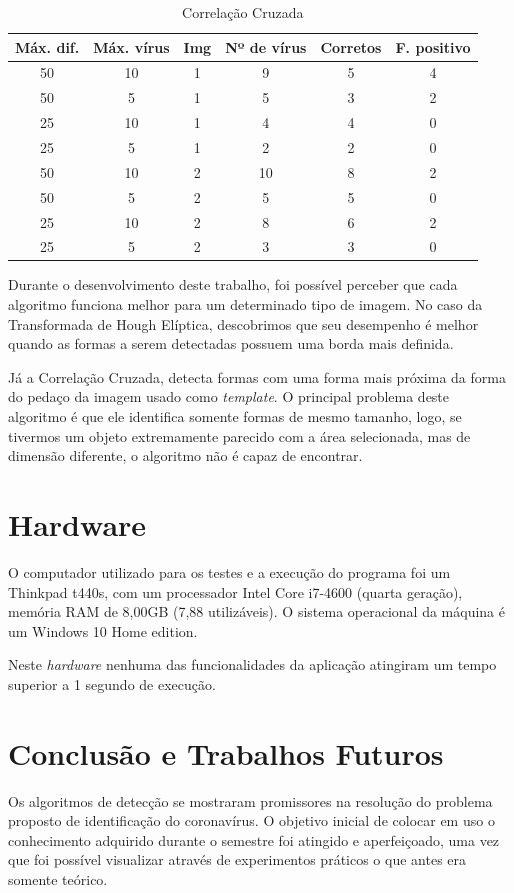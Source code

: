 \documentclass[conference, brazil]{IEEEtran}
\begin{document}
\begin{table}[htpb]
\centering
\caption{Correlação Cruzada}
\begin{tabular}
{|c|c|c|c|c|c|}
\hline
Máx. dif. & Máx. vírus & Img & Nº de vírus & Corretos & F. positivo\\
\hline
50 & 10 & 1 & 9 & 5 & 4\\
\hline
50 & 5 & 1 & 5 & 3 & 2\\
\hline
25 & 10& 1 & 4 & 4 & 0\\
\hline
25 & 5 & 1 & 2 & 2 & 0\\
\hline
50  & 10 & 2 & 10 & 8 & 2\\
\hline
50  & 5 & 2 & 5 & 5 & 0\\
\hline
25 & 10 & 2 & 8 & 6 & 2\\
\hline
25 & 5 & 2 & 3 & 3 & 0\\
\hline
\end{tabular}
\label{table2}
\end{table}

Durante o desenvolvimento deste trabalho, foi possível perceber que cada algoritmo funciona melhor para um determinado tipo de imagem. No caso da Transformada de Hough Elíptica, descobrimos que seu desempenho é melhor quando as formas a serem detectadas possuem uma borda mais definida.

Já a Correlação Cruzada, detecta formas com uma forma mais próxima da forma do pedaço da imagem usado como \textit{template}. O principal problema deste algoritmo é que ele identifica somente formas de mesmo tamanho, logo, se tivermos um objeto extremamente parecido com a área selecionada, mas de dimensão diferente, o algoritmo não é capaz de encontrar.

\section{Hardware}
\label{sec:applications}
O computador utilizado para os testes e a execução do programa foi um Thinkpad t440s, com um processador Intel Core i7-4600 (quarta geração), memória RAM de 8,00GB (7,88 utilizáveis). O sistema operacional da máquina é um Windows 10 Home edition.


Neste \textit{hardware} nenhuma das funcionalidades da aplicação atingiram um tempo superior a 1 segundo de execução.

\section{Conclusão e Trabalhos Futuros}
\label{sec:conclusion}
Os algoritmos de detecção se mostraram promissores na resolução do problema proposto de identificação do coronavírus. O objetivo inicial de colocar em uso o conhecimento adquirido durante o semestre foi atingido e aperfeiçoado, uma vez que foi possível visualizar através de experimentos práticos o que antes era somente teórico.
\end{document}

